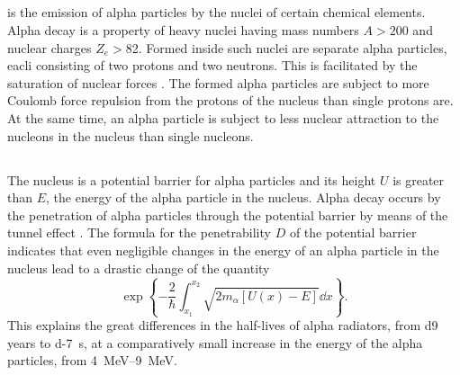 \subsection{}\label{42.5.1}  is the emission of alpha particles by the nuclei of certain chemical elements. Alpha decay  is a property of heavy nuclei having mass numbers $A > 200$ and nuclear charges $Z_{e} > $82. Formed inside such nuclei are separate alpha particles, eacli consisting of two protons and two neutrons. This is facilitated by the saturation of nuclear forces . The formed alpha particles are subject to more Coulomb force repulsion from the protons of the nucleus than single protons are. At the same time, an alpha particle is subject to less nuclear attraction to the nucleons in the nucleus than single nucleons.

\subsection{}\label{42.5.2} The nucleus is a potential barrier  for alpha particles and its height $U$ is greater than $E$, the energy of the alpha particle in the nucleus. Alpha decay occurs by the penetration of alpha particles through the potential barrier by means of
the tunnel effect . The formula for the penetrability $D$ of the potential barrier indicates that even negligible changes in the energy of an alpha particle in the nucleus lead to a drastic change of the quantity
\begin{equation*}%
\exp  \left\{-\frac{2}{\hbar} \int_{x_{1}}^{x_{2}} \sqrt{2m_{\alpha}[U(x) - E]} \dd x \right\}.
\end{equation*}
This explains the great differences in the half-lives of alpha radiators, from \num{d9} years to \SI{d-7}{\second}, at a comparatively small increase in the energy of the alpha particles, from \qtyrange{4}{9}{\mega\electronvolt}.

